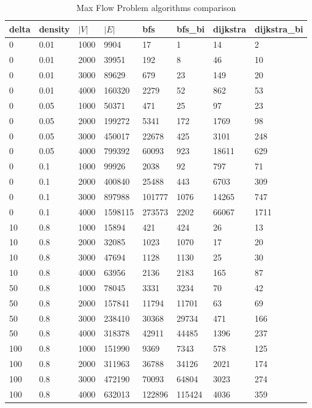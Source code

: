 \begin{table}[p]
\begin{tabular}{llllllll}
delta & density & $|V|$  & $|E|$ & bfs    & bfs\_bi & dijkstra & dijkstra\_bi \\ \hline
0     & 0.01    & 1000 & 9904    & 17     & 1       & 14       & 2            \\
0     & 0.01    & 2000 & 39951   & 192    & 8       & 46       & 10           \\
0     & 0.01    & 3000 & 89629   & 679    & 23      & 149      & 20           \\
0     & 0.01    & 4000 & 160320  & 2279   & 52      & 862      & 53           \\
0     & 0.05    & 1000 & 50371   & 471    & 25      & 97       & 23           \\
0     & 0.05    & 2000 & 199272  & 5341   & 172     & 1769     & 98           \\
0     & 0.05    & 3000 & 450017  & 22678  & 425     & 3101     & 248          \\
0     & 0.05    & 4000 & 799392  & 60093  & 923     & 18611    & 629          \\
0     & 0.1     & 1000 & 99926   & 2038   & 92      & 797      & 71           \\
0     & 0.1     & 2000 & 400840  & 25488  & 443     & 6703     & 309          \\
0     & 0.1     & 3000 & 897988  & 101777 & 1076    & 14265    & 747          \\
0     & 0.1     & 4000 & 1598115 & 273573 & 2202    & 66067    & 1711         \\
10    & 0.8     & 1000 & 15894   & 421    & 424     & 26       & 13           \\
10    & 0.8     & 2000 & 32085   & 1023   & 1070    & 17       & 20           \\
10    & 0.8     & 3000 & 47694   & 1128   & 1130    & 25       & 30           \\
10    & 0.8     & 4000 & 63956   & 2136   & 2183    & 165      & 87           \\
50    & 0.8     & 1000 & 78045   & 3331   & 3234    & 70       & 42           \\
50    & 0.8     & 2000 & 157841  & 11794  & 11701   & 63       & 69           \\
50    & 0.8     & 3000 & 238410  & 30368  & 29734   & 471      & 166          \\
50    & 0.8     & 4000 & 318378  & 42911  & 44485   & 1396     & 237          \\
100   & 0.8     & 1000 & 151990  & 9369   & 7343    & 578      & 125          \\
100   & 0.8     & 2000 & 311963  & 36788  & 34126   & 2021     & 174          \\
100   & 0.8     & 3000 & 472190  & 70093  & 64804   & 3023     & 274          \\
100   & 0.8     & 4000 & 632013  & 122896 & 115424  & 4036     & 359
\end{tabular}
\caption{Max Flow Problem algorithms comparison}\label{table:mf}
\end{table}

